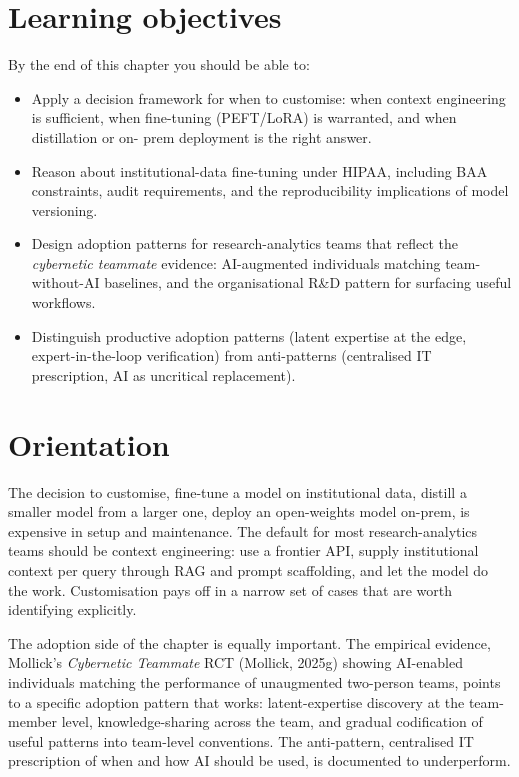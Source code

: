 \documentclass[
  letterpaper,
  11pt]{scrbook}
\providecommand{\tightlist}{%
  \setlength{\itemsep}{0pt}\setlength{\parskip}{0pt}}
\begin{document}
\section{Learning objectives}\label{learning-objectives-12}

By the end of this chapter you should be able to:

\begin{itemize}
\tightlist
\item
  Apply a decision framework for when to customise: when context
  engineering is sufficient, when fine-tuning (PEFT/LoRA) is warranted,
  and when distillation or on- prem deployment is the right answer.
\item
  Reason about institutional-data fine-tuning under HIPAA, including BAA
  constraints, audit requirements, and the reproducibility implications
  of model versioning.
\item
  Design adoption patterns for research-analytics teams that reflect the
  \emph{cybernetic teammate} evidence: AI-augmented individuals matching
  team-without-AI baselines, and the organisational R\&D pattern for
  surfacing useful workflows.
\item
  Distinguish productive adoption patterns (latent expertise at the
  edge, expert-in-the-loop verification) from anti-patterns (centralised
  IT prescription, AI as uncritical replacement).
\end{itemize}

\section{Orientation}\label{orientation-12}

The decision to customise, fine-tune a model on institutional data,
distill a smaller model from a larger one, deploy an open-weights model
on-prem, is expensive in setup and maintenance. The default for most
research-analytics teams should be context engineering: use a frontier
API, supply institutional context per query through RAG and prompt
scaffolding, and let the model do the work. Customisation pays off in a
narrow set of cases that are worth identifying explicitly.

The adoption side of the chapter is equally important. The empirical
evidence, Mollick's \emph{Cybernetic Teammate} RCT (Mollick, 2025g)
showing AI-enabled individuals matching the performance of unaugmented
two-person teams, points to a specific adoption pattern that works:
latent-expertise discovery at the team-member level, knowledge-sharing
across the team, and gradual codification of useful patterns into
team-level conventions. The anti-pattern, centralised IT prescription of
when and how AI should be used, is documented to underperform.
\end{document}
